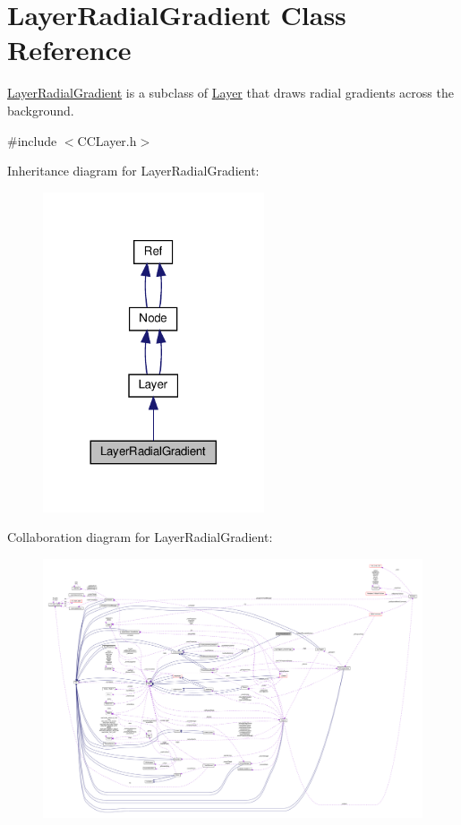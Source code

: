 \hypertarget{classLayerRadialGradient}{}\section{Layer\+Radial\+Gradient Class Reference}
\label{classLayerRadialGradient}


\hyperlink{classLayerRadialGradient}{Layer\+Radial\+Gradient} is a subclass of \hyperlink{classLayer}{Layer} that draws radial gradients across the background.  




{\ttfamily \#include $<$C\+C\+Layer.\+h$>$}



Inheritance diagram for Layer\+Radial\+Gradient\+:
\nopagebreak
\begin{figure}[H]
\begin{center}
\leavevmode
\includegraphics[width=185pt]{classLayerRadialGradient__inherit__graph}
\end{center}
\end{figure}


Collaboration diagram for Layer\+Radial\+Gradient\+:
\nopagebreak
\begin{figure}[H]
\begin{center}
\leavevmode
\includegraphics[width=350pt]{classLayerRadialGradient__coll__graph}
\end{center}
\end{figure}
